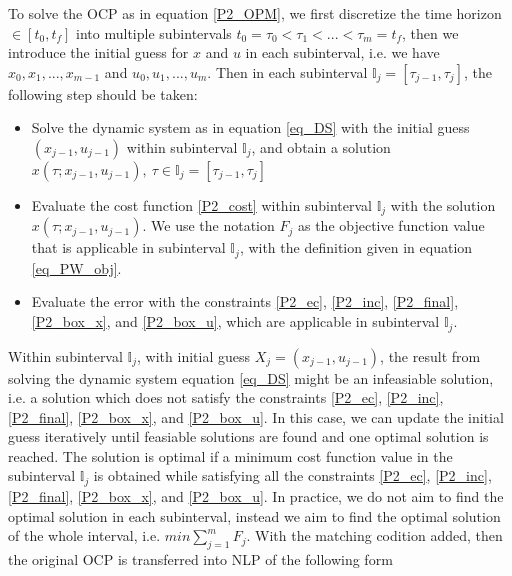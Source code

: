 \documentclass  [
  paper    = a4,
  BCOR     = 10mm,
  twoside,
  fontsize = 12pt,
  fleqn,
  toc      = bibnumbered,
  toc      = listofnumbered,
  numbers  = noendperiod,
  headings = normal,
  listof   = leveldown,
  version  = 3.03
]                                       {scrreprt}
\newcommand{\<}{\langle}
\renewcommand{\>}{\rangle}
\begin{document}
To solve the OCP as in equation \ref{P2_OPM}, we first discretize the time horizon $ \in [t_0, t_f]$ into multiple subintervals $t_0 = \tau_0 < \tau_1 < ... < \tau_m = t_f$, then we introduce the initial guess for $x$ and $u$ in each subinterval, i.e. we have $x_0, x_1, ..., x_{m-1}$ and $u_0, u_1, ..., u_m$. Then in each subinterval $\mathbb{I}_j = [\tau_{j-1}, \tau_j]$, the following step should be taken: 
\begin{itemize}
	\item Solve the dynamic system as in equation \ref{eq_DS} with the initial guess $(x_{j-1}, u_{j-1})$ within subinterval $\mathbb{I}_j$, and obtain a solution $x(\tau; x_{j-1}, u_{j-1}), \ \tau  \in \mathbb{I}_j = [\tau_{j-1}, \tau_j]$  
	\item Evaluate the cost function \ref{P2_cost} within subinterval $\mathbb{I}_j$ with the solution $x(\tau; x_{j-1}, u_{j-1})$. We use the notation $ F_j$ as the objective function value that is applicable in subinterval $\mathbb{I}_j$, with the definition given in equation \ref{eq_PW_obj}.
	\item Evaluate the error with the constraints \ref{P2_ec}, \ref{P2_inc}, \ref{P2_final}, \ref{P2_box_x}, and \ref{P2_box_u}, which are applicable in subinterval $\mathbb{I}_j$. %
\end{itemize}
Within subinterval $\mathbb{I}_j$, with initial guess $X_j = (x_{j-1}, u_{j-1})$,  the result from solving the dynamic system equation \ref{eq_DS} might be an infeasiable solution, i.e. a solution which does not satisfy the constraints \ref{P2_ec}, \ref{P2_inc}, \ref{P2_final}, \ref{P2_box_x}, and \ref{P2_box_u}. In this case, we can update the initial guess iteratively until feasiable solutions are found and one optimal solution is reached. The solution is optimal if a minimum cost function value in the subinterval $\mathbb{I}_j$  is obtained while satisfying all the constraints  \ref{P2_ec}, \ref{P2_inc}, \ref{P2_final}, \ref{P2_box_x}, and \ref{P2_box_u}. In practice, we do not aim to find the optimal solution in each subinterval, instead we aim to find the optimal solution of the whole interval, i.e. $	min  \sum_{j=1}^{m} F_j $. With the matching codition added,  then the original OCP is transferred into NLP of the following form 
\end{document}
